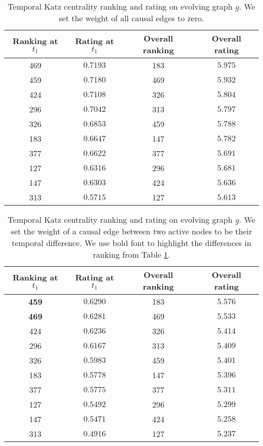 \documentclass[12pt]{article}
\theoremstyle{definition}
\begin{document}
  \begin{table}[h]
    \begin{center}
  \begin{tabular}{ c | c | c | c }
    Ranking at $t_1$ & Rating at $t_1$ & Overall ranking & Overall rating \\ \hline
     469 & $0.7193$ & 183 & $5.975$ \\
     459 & $0.7180$ & 469 & $5.932$ \\
     424 & $0.7108$ & 326 & $5.804$ \\
     296 & $0.7042$ & 313 & $5.797$ \\
     326 & $0.6853$ & 459 & $5.788$ \\
     183 & $0.6647$ & 147 & $5.782$ \\
     377 & $0.6622$ & 377 & $5.691$ \\
     127 & $0.6316$ & 296 & $5.681$ \\
     147 & $0.6303$ & 424 & $5.636$ \\
     313 & $0.5715$ & 127 & $5.613$ \\
  \end{tabular}
  \end{center}
  \caption{Temporal Katz centrality ranking and rating on evolving graph $g$.
  We set the weight of all causal edges to zero.}
  \label{table:ranking}
  \end{table}

  \begin{table}[h]
    \begin{center}
  \begin{tabular}{ c | c | c | c }
    Ranking at $t_1$ & Rating at $t_1$ & Overall ranking & Overall rating \\ \hline
     \textbf{459} & $0.6290$ & 183 & $5.576$ \\
     \textbf{469} & $0.6281$ & 469 & $5.533$ \\
     424 & $0.6236$ & 326 & $5.414$ \\
     296 & $0.6167$ & 313 & $5.409$ \\
     326 & $0.5983$ & 459 & $5.401$ \\
     183 & $0.5778$ & 147 & $5.396$ \\
     377 & $0.5775$ & 377 & $5.311$ \\
     127 & $0.5492$ & 296 & $5.299$ \\
     147 & $0.5471$ & 424 & $5.258$ \\
     313 & $0.4916$ & 127 & $5.237$ \\
  \end{tabular}
  \end{center}
  \caption{Temporal Katz centrality ranking and rating on evolving graph $g$.
  We set the weight of a causal edge between two active nodes to be their temporal difference.
  We use bold font to highlight the differences in ranking from Table \ref{table:ranking}.}
  \label{table:ranking2}
  \end{table}
\end{document}
